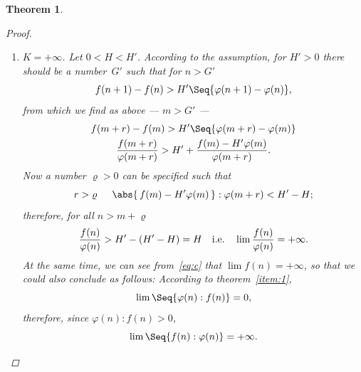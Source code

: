\documentclass[a4paper]{amsbook}
\newtheorem*{theorem*}{Theorem}
\begin{document}
\begin{theorem*}
\begin{proof}
\begin{enumerate}[label=\alph*)]
\begin{equation}
        \qfor
        r > \varrho.
      \end{equation}
      We therefore have
      \begin{equation}
        \label{eq:b}
        \abs*{\frac{f(m+r)}{\varphi(m+r)} - K} < 2\varepsilon
      \end{equation}
      or \(\abs{f(n):\varphi(n) - K} < 2\varepsilon\) for all \(n > m+\varrho\).  Now then, the number \(2\varepsilon\), which can be any positive number, indeed corresponds to the number \(m+\varrho\), since \(m\) results from \(\varepsilon\) initially and after \(m\) the number \(\varrho\) from \(\varepsilon\).  Thus we have
      \begin{equation*}
        \lim f(n):\varphi(n) = K
      \end{equation*}
      for \(\lim n = +\infty\).
    \item \(K = +\infty\).  Let \(0 < H < H'\).  According to the assumption, for \(H' > 0\) there should be a number~\(G'\) such that for \(n>G'\)
      \begin{equation*}
        f(n+1) - f(n) > H' \Seq{\varphi(n+1)-\varphi(n)},
      \end{equation*}
      from which we find as above --- \(m > G'\) ---
      \begin{gather}
        \label{eq:c}
        f(m+r) - f(m) > H' \Seq{\varphi(m+r)-\varphi(m)} \\
        \frac{f(m+r)}{\varphi(m+r)}
        > H' + \frac{f(m)-H'\varphi(m)}{\varphi(m+r)}.
        \nonumber
      \end{gather}
      Now a number \(\varrho > 0\) can be specified such that
      \begin{equation*}
        r > \varrho
        \hspace{1.5em}
        \abs{\,f(m) - H' \varphi(m)\,}:\varphi(m+r) < H' - H;
      \end{equation*}
      therefore, for all \(n > m + \varrho\)
      \begin{equation*}
        \frac{f(n)}{\varphi(n)} > H' - (H' - H) = H
        \quad \text{i.e.} \quad
        \lim\frac{f(n)}{\varphi(n)} = +\infty.
      \end{equation*}
      At the same time, we can see from~\eqref{eq:c} that \(\lim f(n) = +\infty\), so that we could also conclude as follows: According to theorem~\ref{item:1},
      \begin{equation*}
        \lim\Seq{\varphi(n):f(n)} = 0,
      \end{equation*}
      therefore, since \(\varphi(n):f(n) > 0\),
      \begin{equation*}
        \lim\Seq{f(n):\varphi(n)} = +\infty.
        \qedhere
      \end{equation*}
    \end{enumerate}
  \end{proof}
\end{theorem*}
\end{document}
